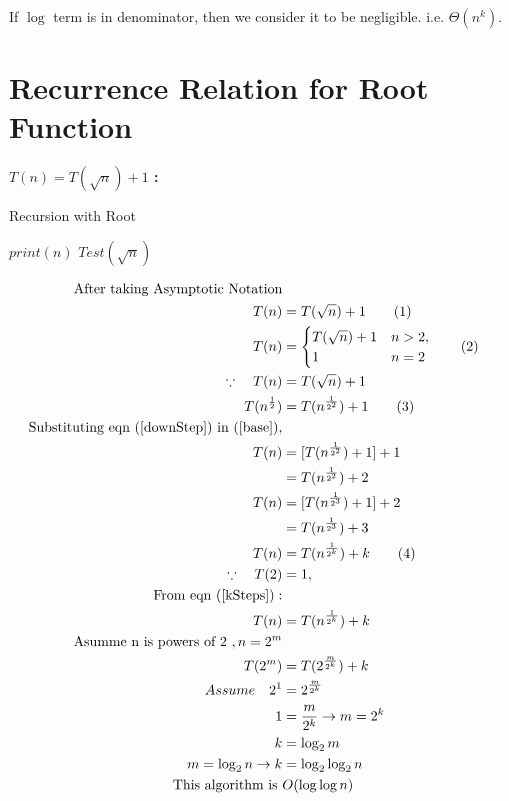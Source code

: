 \documentclass[]{article}
\theoremstyle{plain}
\theoremstyle{definition}
\begin{document}
If $\log$ term is in denominator, then we consider it to be negligible. i.e. $\Theta({n^k})$.

\section{Recurrence Relation for Root Function}
\textbf{$T(n) = T(\sqrt{n}) + 1$ :}
\begin{algorithm}[H]
    \caption{Recursion with Root}
    \label{SimpleRootRecursion}
    \begin{algorithmic}
         
            \State$print(n)$ 
            \State$Test(\sqrt{n})$  
        \EndIf 
        \EndProcedure
    \end{algorithmic}
\end{algorithm}

\begin{align*}
    \text{After taking Asymptotic Notation}\\
    T(n) &= T(\sqrt{n}) + 1 \tag{1} \label{base}\\
    T(n) &=
    \begin{cases}
        T(\sqrt{n}) + 1 & n > 2, \\
        1 & n = 2
    \end{cases} \tag{2} \\  
    \because \hspace{10pt} T(n) &= T(\sqrt{n}) + 1  \\
    T(n^{\frac{1}{2}}) &= T(n^{\frac{1}{2^2}}) + 1 \tag{3} \label{downStep}\\
    \text{Substituting eqn } (\ref{downStep}) \text{ in } (\ref{base}),  \\
    T(n)&= [T(n^{\frac{1}{2^2}}) + 1] + 1\\ 
        &= T(n^{\frac{1}{2^2}}) + 2\\
    T(n)&= [T(n^{\frac{1}{2^3}}) + 1] + 2 \\
        &= T(n^{\frac{1}{2^3}}) + 3\\
    T(n) &= T(n^{\frac{1}{2^k}}) + k \label{kSteps} \tag{4}\\
    \because \hspace{10pt} T(2) &= 1, \\
    \text{From eqn (\ref{kSteps})}:\\
    T(n) &= T(n^{\frac{1}{2^k}}) + k\\
    \text{Asumme n is powers of 2 }, n = 2^m\\
    T(2^m) &= T(2^{\frac{m}{2^k}}) + k\\
    Assume \hspace{10pt} 2^1 &= 2^{\frac{m}{2^k}}\\
    1 &= \frac{m}{2^k} \rightarrow m = 2^k\\
    k &= \log_2{m}\\
    m = \log_2{n} \rightarrow k &= \log_2{\log_2{n}}\\
    \text{This algorithm is } & O(\log{\log{n}})
\end{align*}
\end{document}
